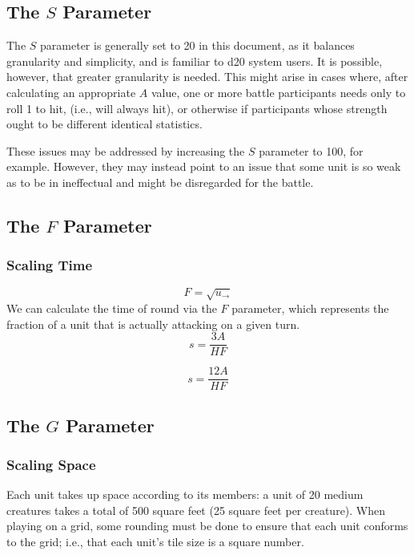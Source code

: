 
\subsection{The $S$ Parameter}
The $S$ parameter is generally set to 20 in this document,
as it balances granularity and simplicity,
and is familiar to d20 system users.
It is possible, however, that greater granularity is needed.
This might arise in cases where,
after calculating an appropriate $A$ value,
one or more battle participants needs only to roll 1 to hit,
(i.e., will always hit),
or otherwise if participants whose strength ought to be different
identical statistics.

These issues may be addressed by increasing the $S$ parameter to 100,
for example.
However, they may instead point to an issue that some unit
is so weak as to be in ineffectual and might be disregarded for the battle.

\subsection{The $F$ Parameter}

\subsubsection{Scaling Time}

\[
    F = \sqrt{u_\rightarrow}
\]
We can calculate the time of round via the $F$ parameter,
which represents the fraction of a unit that is actually attacking on a given turn.
\[
    s = \frac
        {3 A}
        {H F}
\]

\color{red}
\[
    s = \frac{12 A}{H F}
\]
\color{black}

\subsection{The $G$ Parameter}

\subsubsection{Scaling Space}

Each unit takes up space according to its members:
a unit of 20 medium creatures takes a total of 500 square feet (25 square feet per creature).
When playing on a grid,
some rounding must be done to ensure that each unit conforms to the grid;
i.e., that each unit's tile size is a square number.

